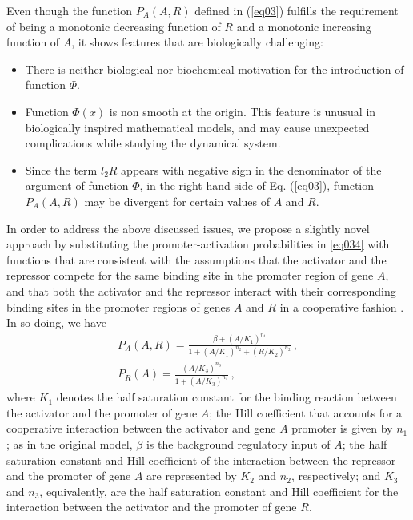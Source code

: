 \documentclass[%
 preprint,
 amsmath,amssymb,
 aps,
]{revtex4-2}
\begin{document}
	Even though the function $P_A(A, R)$ defined in (\ref{eq03}) fulfills the
	requirement of being a monotonic decreasing function of $R$ and a monotonic
	increasing function of $A$, it shows features that are biologically challenging:
	\begin{itemize}
		\item There is neither biological nor biochemical motivation for the introduction of function
		$\Phi$.
		\item Function $\Phi(x)$ is non smooth at the origin. This feature is
		unusual in biologically inspired mathematical models, and may cause unexpected
		complications while studying the dynamical system.
		\item Since the term $l_2 R$ appears with negative sign in the denominator of
		the argument of function $\Phi$, in the right hand side of Eq. (\ref{eq03}),
		function $P_A(A, R)$ may be divergent for certain values of $A$ and $R$.
	\end{itemize}
	
	In order to address the above discussed issues, we propose a slightly novel approach by
	substituting the promoter-activation probabilities in \eqref{eq034} with functions that are consistent
	with the assumptions that the activator and the repressor compete for
	the same binding site in the promoter region of gene $A$, and that both the
	activator and the repressor interact with their corresponding binding sites in
	the promoter regions of genes $A$ and $R$ in a cooperative fashion
	\citep{Santillan2008b}. In so doing, we have
	\begin{subequations}\label{eq056}
		\begin{gather}
		P_A(A,R) = \displaystyle \frac{\beta + (A/K_1)^{n_1}}{1 + (A/K_1)^{n_2} +
			(R/K_2)^{n_2}}\,, \label{eq05} \\[3mm]
		P_R(A)  = \displaystyle \frac{(A/K_3)^{n_3}}{1 + (A/K_3)^{n_3}}\,,
		\label{eq06}
		\end{gather}
	\end{subequations}
	where $K_1$ denotes the half saturation constant for the binding reaction
	between the activator and the promoter of gene $A$; the Hill coefficient that
	accounts for a cooperative interaction between the activator and gene $A$
	promoter is given by $n_1$; as in the original model, $\beta$ is the background
	regulatory input of $A$; the half saturation constant and Hill coefficient of
	the interaction between the repressor and the promoter of gene $A$ are
	represented by $K_2$ and $n_2$, respectively; and $K_3$ and $n_3$, equivalently,
	are the half saturation constant and Hill coefficient for the interaction
	between the activator and the promoter of gene $R$. 
	
\end{document}

